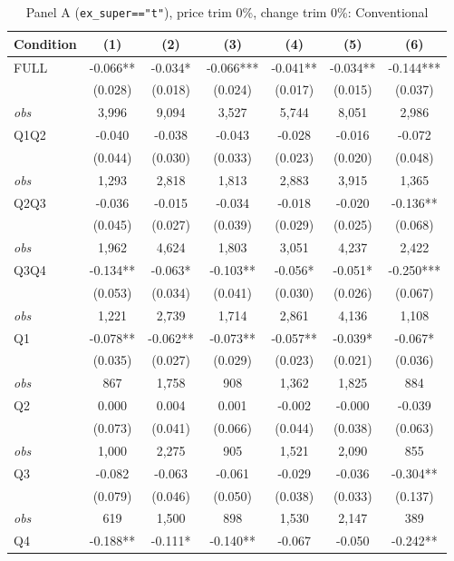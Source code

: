 \begin{table}[!htbp]
\centering
\caption{Panel A (\texttt{ex\_super=="t"}), price trim 0\%, change trim 0\%: Conventional}
\label{tab:a:trim00:conventional}
\small
\begin{tabular}{lcccccc}
\toprule
Condition & (1) & (2) & (3) & (4) & (5) & (6) \\
\midrule
FULL & -0.066** & -0.034* & -0.066*** & -0.041** & -0.034** & -0.144*** \\
 & (0.028) & (0.018) & (0.024) & (0.017) & (0.015) & (0.037) \\
\textit{obs} & 3,996 & 9,094 & 3,527 & 5,744 & 8,051 & 2,986 \\
Q1Q2 & -0.040 & -0.038 & -0.043 & -0.028 & -0.016 & -0.072 \\
 & (0.044) & (0.030) & (0.033) & (0.023) & (0.020) & (0.048) \\
\textit{obs} & 1,293 & 2,818 & 1,813 & 2,883 & 3,915 & 1,365 \\
Q2Q3 & -0.036 & -0.015 & -0.034 & -0.018 & -0.020 & -0.136** \\
 & (0.045) & (0.027) & (0.039) & (0.029) & (0.025) & (0.068) \\
\textit{obs} & 1,962 & 4,624 & 1,803 & 3,051 & 4,237 & 2,422 \\
Q3Q4 & -0.134** & -0.063* & -0.103** & -0.056* & -0.051* & -0.250*** \\
 & (0.053) & (0.034) & (0.041) & (0.030) & (0.026) & (0.067) \\
\textit{obs} & 1,221 & 2,739 & 1,714 & 2,861 & 4,136 & 1,108 \\
Q1 & -0.078** & -0.062** & -0.073** & -0.057** & -0.039* & -0.067* \\
 & (0.035) & (0.027) & (0.029) & (0.023) & (0.021) & (0.036) \\
\textit{obs} &   867 & 1,758 &   908 & 1,362 & 1,825 &   884 \\
Q2 & 0.000 & 0.004 & 0.001 & -0.002 & -0.000 & -0.039 \\
 & (0.073) & (0.041) & (0.066) & (0.044) & (0.038) & (0.063) \\
\textit{obs} & 1,000 & 2,275 &   905 & 1,521 & 2,090 &   855 \\
Q3 & -0.082 & -0.063 & -0.061 & -0.029 & -0.036 & -0.304** \\
 & (0.079) & (0.046) & (0.050) & (0.038) & (0.033) & (0.137) \\
\textit{obs} &   619 & 1,500 &   898 & 1,530 & 2,147 &   389 \\
Q4 & -0.188** & -0.111* & -0.140** & -0.067 & -0.050 & -0.242** \\

\end{tabular}
\end{table}
